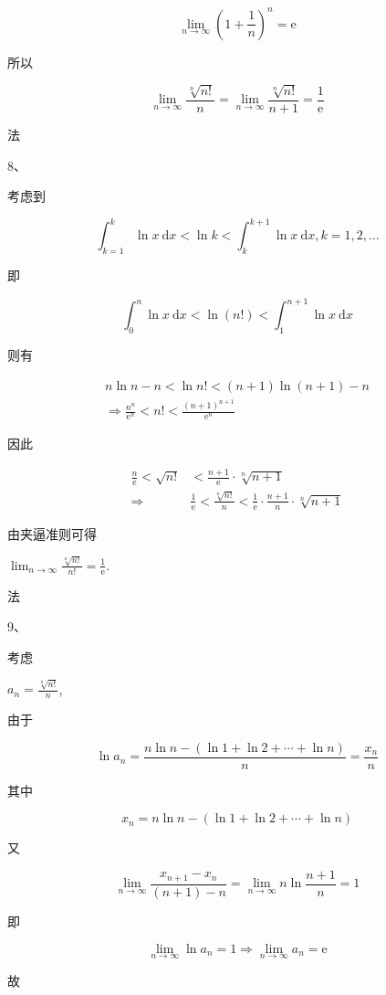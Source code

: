 \documentclass[10pt]{article}
\begin{document}
$$
\lim _{n \rightarrow \infty}\left(1+\frac{1}{n}\right)^{n}=\mathrm{e}
$$
\begin{CJK}{UTF8}{mj}所以\end{CJK}
$$
\lim _{n \rightarrow \infty} \frac{\sqrt[n]{n !}}{n}=\lim _{n \rightarrow \infty} \frac{\sqrt[n]{n !}}{n+1}=\frac{1}{\mathrm{e}}
$$
\begin{CJK}{UTF8}{mj}法\end{CJK} 8、\begin{CJK}{UTF8}{mj}考虑到\end{CJK}
$$
\int_{k=1}^{k} \ln x \mathrm{~d} x<\ln k<\int_{k}^{k+1} \ln x \mathrm{~d} x, k=1,2, \ldots
$$
\begin{CJK}{UTF8}{mj}即\end{CJK}
$$
\int_{0}^{n} \ln x \mathrm{~d} x<\ln (n !)<\int_{1}^{n+1} \ln x \mathrm{~d} x
$$
\begin{CJK}{UTF8}{mj}则有\end{CJK}
$$
\begin{gathered}
n \ln n-n<\ln n !<(n+1) \ln (n+1)-n \\
\Rightarrow \frac{n^{n}}{\mathrm{e}^{n}}<n !<\frac{(n+1)^{n+1}}{\mathrm{e}^{n}}
\end{gathered}
$$
\begin{CJK}{UTF8}{mj}因此\end{CJK}
$$
\begin{aligned}
\frac{n}{\mathrm{e}}<\sqrt{n !} &<\frac{n+1}{\mathrm{e}} \cdot \sqrt[n]{n+1} \\
\Rightarrow & \frac{1}{\mathrm{e}}<\frac{\sqrt[n]{n !}}{n}<\frac{1}{\mathrm{e}} \cdot \frac{n+1}{n} \cdot \sqrt[n]{n+1}
\end{aligned}
$$
\begin{CJK}{UTF8}{mj}由夹逼准则可得\end{CJK} $\lim _{n \rightarrow \infty} \frac{\sqrt[n]{n !}}{n !}=\frac{1}{\mathrm{e}}$.

\begin{CJK}{UTF8}{mj}法\end{CJK} 9、\begin{CJK}{UTF8}{mj}考虑\end{CJK} $a_{n}=\frac{\sqrt[n]{n !}}{n}$, \begin{CJK}{UTF8}{mj}由于\end{CJK}
$$
\ln a_{n}=\frac{n \ln n-(\ln 1+\ln 2+\cdots+\ln n)}{n}=\frac{x_{n}}{n}
$$
\begin{CJK}{UTF8}{mj}其中\end{CJK}
$$
x_{n}=n \ln n-(\ln 1+\ln 2+\cdots+\ln n)
$$
\begin{CJK}{UTF8}{mj}又\end{CJK}
$$
\lim _{n \rightarrow \infty} \frac{x_{n+1}-x_{n}}{(n+1)-n}=\lim _{n \rightarrow \infty} n \ln \frac{n+1}{n}=1
$$
\begin{CJK}{UTF8}{mj}即\end{CJK}
$$
\lim _{n \rightarrow \infty} \ln a_{n}=1 \Rightarrow \lim _{n \rightarrow \infty} a_{n}=\mathrm{e}
$$
\begin{CJK}{UTF8}{mj}故\end{CJK}
\end{document}
